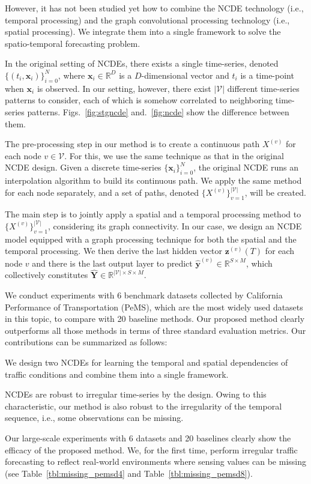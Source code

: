\documentclass[letterpaper]{article} \usepackage{aaai22}  \usepackage{times}  \usepackage{helvet}  \usepackage{courier}  \usepackage[hyphens]{url}  \usepackage{graphicx} \urlstyle{rm} \def\UrlFont{\rm}  \usepackage{natbib}  \usepackage{caption} \DeclareCaptionStyle{ruled}{labelfont=normalfont,labelsep=colon,strut=off} \frenchspacing  \setlength{\pdfpagewidth}{8.5in}  \setlength{\pdfpageheight}{11in}  \usepackage{stfloats}
\begin{document}
However, it has not been studied yet how to combine the NCDE technology (i.e., temporal processing) and the graph convolutional processing technology (i.e., spatial processing). We integrate them into a single framework to solve the spatio-temporal forecasting problem.

In the original setting of NCDEs, there exists a single time-series, denoted $\{(t_i, \bm{x}_{i})\}_{i=0}^N$, where $\bm{x}_{i} \in \mathbb{R}^D$ is a $D$-dimensional vector and $t_i$ is a time-point when $\bm{x}_{i}$ is observed. In our setting, however, there exist $|\mathcal{V}|$ different time-series patterns to consider, each of which is somehow correlated to neighboring time-series patterns. Figs.~\ref{fig:stgncde} and.~\ref{fig:ncde} show the difference between them.

The pre-processing step in our method is to create a continuous path $X^{(v)}$ for each node $v \in \mathcal{V}$. For this, we use the same technique as that in the original NCDE design. Given a discrete time-series $\{\bm{x}_{i}\}_{i=0}^N$, the original NCDE runs an interpolation algorithm to build its continuous path. We apply the same method for each node separately, and a set of paths, denoted $\{X^{(v)}\}_{v=1}^{|\mathcal{V}|}$, will be created.

The main step is to jointly apply a spatial and a temporal processing method to $\{X^{(v)}\}_{v=1}^{|\mathcal{V}|}$, considering its graph connectivity. In our case, we design an NCDE model equipped with a graph processing technique for both the spatial and the temporal processing. We then derive the last hidden vector $\bm{z}^{(v)}(T)$ for each node $v$ and there is the last output layer to predict $\hat{\bm{y}}^{(v)} \in \mathbb{R}^{S \times M}$, which collectively constitutes $\hat{\bm{Y}} \in \mathbb{R}^{|\mathcal{V}| \times S \times M}$.

We conduct experiments with 6 benchmark datasets collected by California Performance of Transportation (PeMS), which are the most widely used datasets in this topic, to compare with 20 baseline methods. Our proposed method clearly outperforms all those methods in terms of three standard evaluation metrics. Our contributions can be summarized as follows:
\begin{compactenum}
    \item We design two NCDEs for learning the temporal and spatial dependencies of traffic conditions and combine them into a single framework.
    \item NCDEs are robust to irregular time-series by the design. Owing to this characteristic, our method is also robust to the irregularity of the temporal sequence, i.e., some observations can be missing. 
    \item Our large-scale experiments with 6 datasets and 20 baselines clearly show the efficacy of the proposed method. We, for the first time, perform irregular traffic forecasting to reflect real-world environments where sensing values can be missing (see Table~\ref{tbl:missing_pemsd4} and Table~\ref{tbl:missing_pemsd8}).
\end{compactenum}
\end{document}
